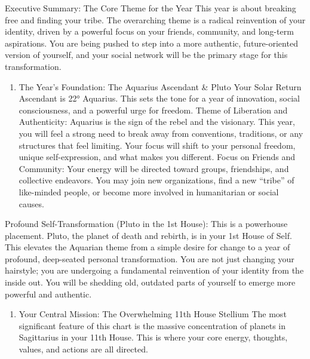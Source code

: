 \documentclass{article}
\begin{document}
Executive Summary: The Core Theme for the Year This year is about breaking free and finding your tribe. The overarching theme is a radical reinvention of your identity, driven by a powerful focus on your friends, community, and long-term aspirations. You are being pushed to step into a more authentic, future-oriented version of yourself, and your social network will be the primary stage for this transformation.

\begin{enumerate}
\item
  The Year's Foundation: The Aquarius Ascendant \& Pluto Your Solar Return Ascendant is 22° Aquarius. This sets the tone for a year of innovation, social consciousness, and a powerful urge for freedom. Theme of Liberation and Authenticity: Aquarius is the sign of the rebel and the visionary. This year, you will feel a strong need to break away from conventions, traditions, or any structures that feel limiting. Your focus will shift to your personal freedom, unique self-expression, and what makes you different. Focus on Friends and Community: Your energy will be directed toward groups, friendships, and collective endeavors. You may join new organizations, find a new ``tribe'' of like-minded people, or become more involved in humanitarian or social causes.
\end{enumerate}

Profound Self-Transformation (Pluto in the 1st House): This is a powerhouse placement. Pluto, the planet of death and rebirth, is in your 1st House of Self. This elevates the Aquarian theme from a simple desire for change to a year of profound, deep-seated personal transformation. You are not just changing your hairstyle; you are undergoing a fundamental reinvention of your identity from the inside out. You will be shedding old, outdated parts of yourself to emerge more powerful and authentic.

\begin{enumerate}
\item
  Your Central Mission: The Overwhelming 11th House Stellium The most significant feature of this chart is the massive concentration of planets in Sagittarius in your 11th House. This is where your core energy, thoughts, values, and actions are all directed.
\end{enumerate}
\end{document}
